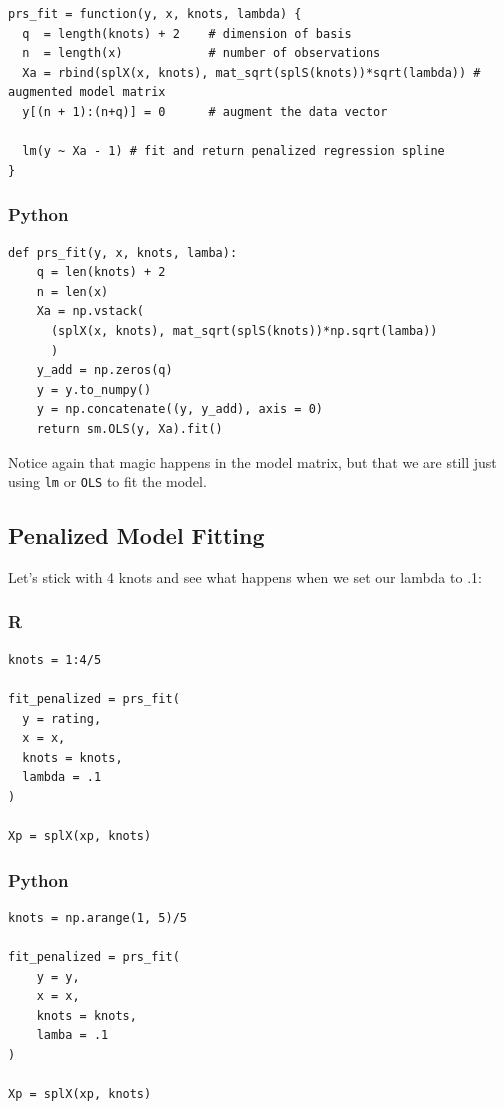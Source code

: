 \documentclass[
  letterpaper,
]{krantz}
\begin{document}
\begin{verbatim}
prs_fit = function(y, x, knots, lambda) {
  q  = length(knots) + 2    # dimension of basis
  n  = length(x)            # number of observations
  Xa = rbind(splX(x, knots), mat_sqrt(splS(knots))*sqrt(lambda)) # augmented model matrix
  y[(n + 1):(n+q)] = 0      # augment the data vector
  
  lm(y ~ Xa - 1) # fit and return penalized regression spline
}
\end{verbatim}

\subsubsection{Python}

\begin{verbatim}
def prs_fit(y, x, knots, lamba):
    q = len(knots) + 2
    n = len(x)
    Xa = np.vstack(
      (splX(x, knots), mat_sqrt(splS(knots))*np.sqrt(lamba))
      )
    y_add = np.zeros(q)
    y = y.to_numpy()
    y = np.concatenate((y, y_add), axis = 0)
    return sm.OLS(y, Xa).fit()
\end{verbatim}

Notice again that magic happens in the model matrix, but that we are
still just using \texttt{lm} or \texttt{OLS} to fit the model.

\subsection{Penalized Model Fitting}\label{sec-gam-penalty-fitting}

Let's stick with 4 knots and see what happens when we set our lambda to
.1:

\subsubsection{R}

\begin{verbatim}
knots = 1:4/5

fit_penalized = prs_fit(
  y = rating,
  x = x,
  knots = knots,
  lambda = .1
) 

Xp = splX(xp, knots) 
\end{verbatim}

\subsubsection{Python}

\begin{verbatim}
knots = np.arange(1, 5)/5

fit_penalized = prs_fit(
    y = y,
    x = x,
    knots = knots,
    lamba = .1
)

Xp = splX(xp, knots)
\end{verbatim}
\end{document}
